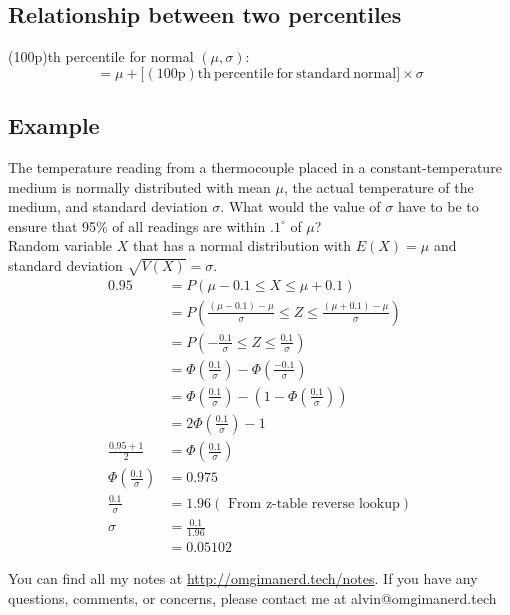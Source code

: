 \documentclass{math}
\begin{document}
\subsection*{Relationship between two percentiles}
(100p)th percentile for normal \( (\mu,\sigma) \):
\[ = \mu +\big[\mathrm{(100p)th\ percentile\ for\ standard\ normal}\big]
   \times\sigma \]

\subsection*{Example}
The temperature reading from a thermocouple placed in a constant-temperature
medium is normally distributed with mean \( \mu \), the actual temperature
of the medium, and standard deviation \( \sigma \). What would the value of
\( \sigma \) have to be to ensure that 95\% of all readings are within
\( .1^{\circ} \) of \( \mu \)? \\
Random variable \( X \) that has a normal distribution with \( E(X) = \mu \)
and standard deviation \( \sqrt{V(X)} = \sigma \).
\begin{align*}
  0.95 &= P(\mu-0.1\leq X\leq\mu+0.1) \\
  &= P(\frac{(\mu-0.1)-\mu}{\sigma}\leq Z\leq\frac{(\mu+0.1)-\mu}{\sigma}) \\
  &= P\left(-\frac{0.1}{\sigma}\leq Z\leq\frac{0.1}{\sigma}\right) \\
  &= \Phi\left(\frac{0.1}{\sigma}\right)-\Phi\left(\frac{-0.1}{\sigma}\right) \\
  &= \Phi\left(\frac{0.1}{\sigma}\right)-
    \left(1-\Phi\left(\frac{0.1}{\sigma}\right)\right) \\
  &= 2\Phi\left(\frac{0.1}{\sigma}\right)-1 \\
  \frac{0.95+1}{2} &= \Phi\left(\frac{0.1}{\sigma}\right) \\
  \Phi(\frac{0.1}{\sigma}) &= 0.975 \\
  \frac{0.1}{\sigma} &= 1.96 (\textrm{  From z-table reverse lookup})\\
  \sigma &= \frac{0.1}{1.96} \\
  &= 0.05102
\end{align*}

\begin{center}
  You can find all my notes at \url{http://omgimanerd.tech/notes}. If you have
  any questions, comments, or concerns, please contact me at
  alvin@omgimanerd.tech
\end{center}
\end{document}
